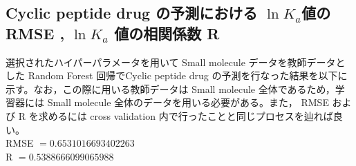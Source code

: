\documentclass[a4j,11pt]{jarticle}
\begin{document}
\subsection{Cyclic peptide drug の予測における $\ln{K_a}$値の RMSE , $\ln{K_a}$ 値の相関係数 R}
 選択されたハイパーパラメータを用いて Small molecule データを教師データとした Random Forest 回帰でCyclic peptide drug の予測を行なった結果を以下に示す。なお，この際に用いる教師データは Small molecule 全体であるため，学習器には Small molecule 全体のデータを用いる必要がある。また， RMSE および R を求めるには cross validation 内で行ったことと同じプロセスを辿れば良い。\\
 \linebreak
RMSE $= 0.6531016693402263$\\
R $= 0.5388666099065988$ \\

\end{document}
